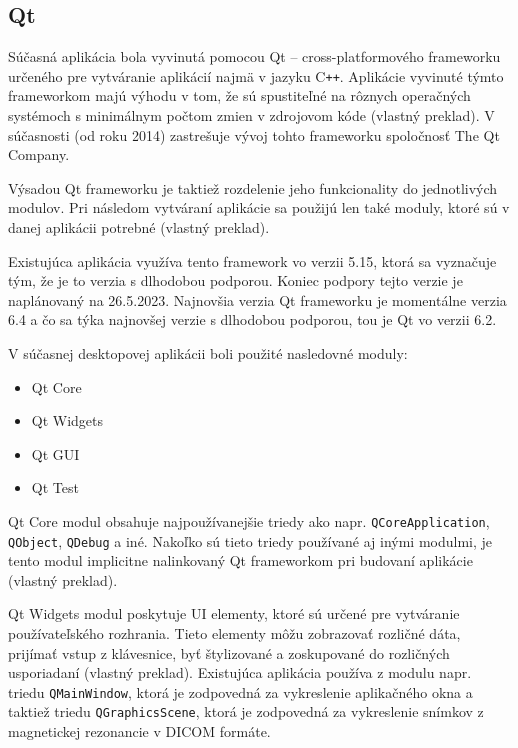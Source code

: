 \subsection {Qt}
Súčasná aplikácia bola vyvinutá pomocou Qt -- cross-platformového frameworku určeného pre vytváranie aplikácií najmä v jazyku C\texttt{++}. Aplikácie vyvinuté týmto frameworkom majú výhodu v tom, že sú spustiteľné na rôznych operačných systémoch s minimálnym počtom zmien v zdrojovom kóde \cite{qt_description} (vlastný preklad). V súčasnosti (od roku 2014) zastrešuje vývoj tohto frameworku spoločnosť The Qt Company.

Výsadou Qt frameworku je taktiež rozdelenie jeho funkcionality do jednotlivých modulov. Pri následom vytváraní aplikácie sa použijú len také moduly, ktoré sú v danej aplikácii potrebné \cite{qt_description} (vlastný preklad).

Existujúca aplikácia využíva tento framework vo verzii 5.15, ktorá sa vyznačuje tým, že je to verzia s dlhodobou podporou. Koniec podpory tejto verzie je naplánovaný na 26.5.2023. Najnovšia verzia Qt frameworku je momentálne verzia 6.4 a čo sa týka najnovšej verzie s dlhodobou podporou, tou je Qt vo verzii 6.2.

V súčasnej desktopovej aplikácii boli použité nasledovné moduly: 

\begin{itemize}
\item {Qt Core}
\item {Qt Widgets}
\item {Qt GUI}
\item {Qt Test}
\end{itemize}

Qt Core modul obsahuje najpoužívanejšie triedy ako napr. \texttt{QCoreApplication}, \texttt{QObject}, \texttt{QDebug} a iné. Nakoľko sú tieto triedy používané aj inými modulmi, je tento modul implicitne nalinkovaný Qt frameworkom pri budovaní aplikácie \cite{qtcore_description} (vlastný preklad). \newline

Qt Widgets modul poskytuje UI elementy, ktoré sú určené pre vytváranie používateľského rozhrania. Tieto elementy môžu zobrazovať rozličné dáta, prijímať vstup z klávesnice, byť štylizované a zoskupované do rozličných usporiadaní \cite{qtwidgets_description} (vlastný preklad). Existujúca aplikácia používa z modulu napr. triedu \texttt{QMainWindow}, ktorá je zodpovedná za vykreslenie aplikačného okna a taktiež triedu \texttt{QGraphicsScene}, ktorá je zodpovedná za vykreslenie snímkov z magnetickej rezonancie v DICOM formáte. \newline

